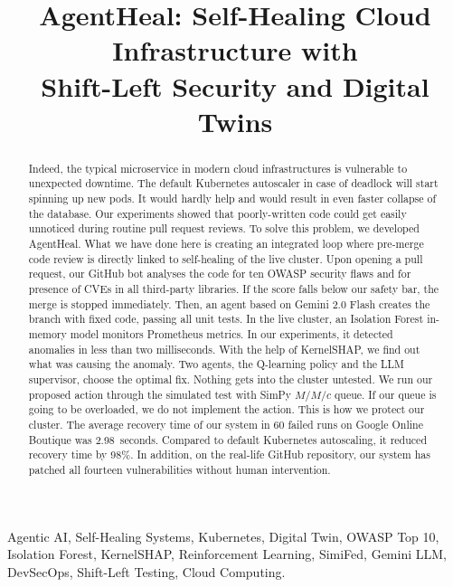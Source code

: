 \documentclass[10pt,conference]{IEEEtran}
\begin{document}
\title{AgentHeal: Self-Healing Cloud Infrastructure with\\ Shift-Left Security and Digital Twins}

\author{
}

\maketitle

\begin{abstract}
Indeed, the typical microservice in modern cloud infrastructures is vulnerable to unexpected downtime. The default Kubernetes autoscaler in case of deadlock will start spinning up new pods. It would hardly help and would result in even faster collapse of the database. Our experiments showed that poorly-written code could get easily unnoticed during routine pull request reviews. To solve this problem, we developed AgentHeal. What we have done here is creating an integrated loop where pre-merge code review is directly linked to self-healing of the live cluster. Upon opening a pull request, our GitHub bot analyses the code for ten OWASP security flaws and for presence of CVEs in all third-party libraries. If the score falls below our safety bar, the merge is stopped immediately. Then, an agent based on Gemini 2.0 Flash creates the branch with fixed code, passing all unit tests. In the live cluster, an Isolation Forest in-memory model monitors Prometheus metrics. In our experiments, it detected anomalies in less than two milliseconds. With the help of KernelSHAP, we find out what was causing the anomaly. Two agents, the Q-learning policy and the LLM supervisor, choose the optimal fix. Nothing gets into the cluster untested. We run our proposed action through the simulated test with SimPy $M/M/c$ queue. If our queue is going to be overloaded, we do not implement the action. This is how we protect our cluster. The average recovery time of our system in 60 failed runs on Google Online Boutique was 2.98~seconds. Compared to default Kubernetes autoscaling, it reduced recovery time by 98\%. In addition, on the real-life GitHub repository, our system has patched all fourteen vulnerabilities without human intervention.
\end{abstract}

\begin{IEEEkeywords}
Agentic AI, Self-Healing Systems, Kubernetes, Digital Twin, OWASP Top 10, Isolation Forest, KernelSHAP, Reinforcement Learning, SimiFed, Gemini LLM, DevSecOps, Shift-Left Testing, Cloud Computing.
\end{IEEEkeywords}
\end{document}
